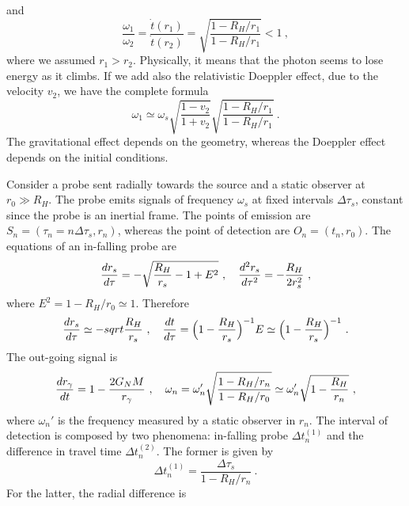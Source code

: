     and 
    \begin{equation*}
        \frac{\omega_1}{\omega_2} = \frac{\dot t(r_1)}{\dot t(r_2)} = \sqrt{ \frac{1 - R_H / r_1}{1 - R_H/r_1}} < 1 ~,
    \end{equation*}
    where we assumed $r_1 > r_2$. Physically, it means that the photon seems to lose energy as it climbs. If we add also the relativistic Doeppler effect, due to the velocity $v_2$, we have the complete formula 
    \begin{equation*}
        \omega_1 \simeq \omega_s \sqrt{\frac{1-v_2}{1+v_2}} \sqrt{ \frac{1 - R_H / r_1}{1 - R_H/r_1}} ~.
    \end{equation*}
    The gravitational effect depends on the geometry, whereas the Doeppler effect depends on the initial conditions.

    Consider a probe sent radially towards the source and a static observer at $r_0 \gg R_H$. The probe emits signals of frequency $\omega_s$ at fixed intervals $\Delta \tau_s$, constant since the probe is an inertial frame. The points of emission are $S_n = (\tau_n = n \Delta \tau_s, r_n)$, whereas the point of detection are $O_n = (t_n, r_0)$. The equations of an in-falling probe are
    \begin{equation*}
        \frac{dr_s}{d\tau} = - \sqrt{\frac{R_H}{r_s} - 1 + E^2} ~, \quad \frac{d^2r_s}{d\tau^2} = - \frac{R_H}{2 r_s^2} ~,
    \end{equation*}
    where $E^2 = 1 - R_H/r_0 \simeq 1$. Therefore 
    \begin{equation*}
        \frac{dr_s}{d\tau} \simeq - sqrt{\frac{R_H}{r_s}} ~, \quad \frac{dt}{d\tau} = \Big ( 1 - \frac{R_H}{r_s} \Big)^{-1} E \simeq \Big ( 1 - \frac{R_H}{r_s} \Big)^{-1} ~.
    \end{equation*}
    The out-going signal is 
    \begin{equation*}
        \frac{dr_\gamma}{dt} = 1 - \frac{2 G_N M}{r_\gamma} ~, \quad \omega_n = \omega_n' \sqrt{\frac{1 - R_H/r_n}{1 - R_H/r_0}} \simeq \omega_n' \sqrt{1 - \frac{R_H}{r_n}} ~,
    \end{equation*}
    where $\omega_n'$ is the frequency measured by a static observer in $r_n$. The interval of detection is composed by two phenomena: in-falling probe $\Delta t_n^{(1)}$ and the difference in travel time $\Delta t_n^{(2)}$. The former is given by 
    \begin{equation*}
        \Delta t_n^{(1)} = \frac{\Delta \tau_s}{1 - R_H/r_n} ~.
    \end{equation*}
    For the latter, the radial difference is 
